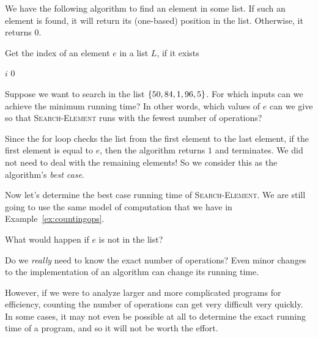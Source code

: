\begin{example}
\label{ex:searching-list}
We have the following algorithm to find an element in some list. If such an element is found, it will return its (one-based) position in the list. Otherwise, it returns $0$.

\begin{algorithm}[H]
    \label{alg:search-element}
    \caption{Get the index of an element $e$ in a list $L$, if it exists}
    \begin{algorithmic}[1]
                    \Return $i$
                \EndIf
            \EndFor
            \Return $0$
        \EndFunction
    \end{algorithmic}
\end{algorithm}

Suppose we want to search in the list $\left\{50,84,1,96,5\right\}$. For which inputs can we achieve the minimum running time? In other words, which values of $e$ can we give so that \textsc{Search-Element} runs with the fewest number of operations?

Since the for loop checks the list from the first element to the last element, if the first element is equal to $e$, then the algorithm returns $1$ and terminates. We did not need to deal with the remaining elements! So we consider this as the algorithm's \textit{best case}.

Now let's determine the best case running time of \textsc{Search-Element}. We are still going to use the same model of computation that we have in Example~\ref{ex:countingops}.

What would happen if $e$ is not in the list?

\end{example}

Do we \textit{really} need to know the exact number of operations? Even minor changes to the implementation of an algorithm can change its running time.

However, if we were to analyze larger and more complicated programs for efficiency, counting the number of operations can get very difficult very quickly. In some cases, it may not even be possible at all to determine the exact running time of a program, and so it will not be worth the effort.

